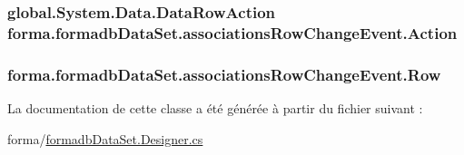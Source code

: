 \subsubsection[{\texorpdfstring{Action}{Action}}]{\setlength{\rightskip}{0pt plus 5cm}global.\+System.\+Data.\+Data\+Row\+Action forma.\+formadb\+Data\+Set.\+associations\+Row\+Change\+Event.\+Action\hspace{0.3cm}{\ttfamily [get]}}\hypertarget{classforma_1_1formadb_data_set_1_1associations_row_change_event_a7429bb8842f94cad23aa649ba9eeafed}{}\label{classforma_1_1formadb_data_set_1_1associations_row_change_event_a7429bb8842f94cad23aa649ba9eeafed}
\subsubsection[{\texorpdfstring{Row}{Row}}]{ forma.\+formadb\+Data\+Set.\+associations\+Row\+Change\+Event.\+Row\hspace{0.3cm}{\ttfamily [get]}}\hypertarget{classforma_1_1formadb_data_set_1_1associations_row_change_event_af13f50b313d854497aa0667c9696154a}{}\label{classforma_1_1formadb_data_set_1_1associations_row_change_event_af13f50b313d854497aa0667c9696154a}


La documentation de cette classe a été générée à partir du fichier suivant \+:\begin{DoxyCompactItemize}
\item 
forma/\hyperlink{formadb_data_set_8_designer_8cs}{formadb\+Data\+Set.\+Designer.\+cs}\end{DoxyCompactItemize}
